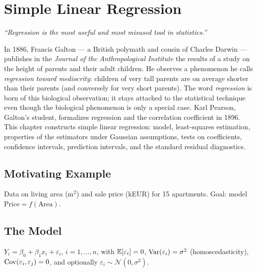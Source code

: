 \chapter{Simple Linear Regression}
\label{ch:simple-regression}

\begin{center}
\textit{``Regression is the most useful and most misused tool in statistics.''}
\end{center}

In 1886, Francis Galton --- a British polymath and cousin of Charles Darwin --- publishes in the \emph{Journal of the Anthropological Institute} the results of a study on the height of parents and their adult children. He observes a phenomenon he calls \emph{regression toward mediocrity}: children of very tall parents are on average shorter than their parents (and conversely for very short parents). The word \emph{regression} is born of this biological observation; it stays attached to the statistical technique even though the biological phenomenon is only a special case. Karl Pearson, Galton's student, formalizes regression and the correlation coefficient in 1896. This chapter constructs simple linear regression: model, least-squares estimation, properties of the estimators under Gaussian assumptions, tests on coefficients, confidence intervals, prediction intervals, and the standard residual diagnostics.

\section{Motivating Example}
Data on living area (m$^2$) and sale price (kEUR) for 15 apartments. Goal: model $\text{Price}=f(\text{Area})$.

\section{The Model}

\begin{definition}
$Y_i = \beta_0 + \beta_1 x_i + \varepsilon_i$, $i=1,\ldots,n$, with $\mathbb{E}[\varepsilon_i]=0$, $\operatorname{Var}(\varepsilon_i)=\sigma^2$ (homoscedasticity), $\operatorname{Cov}(\varepsilon_i,\varepsilon_j)=0$, and optionally $\varepsilon_i\sim\mathcal{N}(0,\sigma^2)$.
\end{definition}

